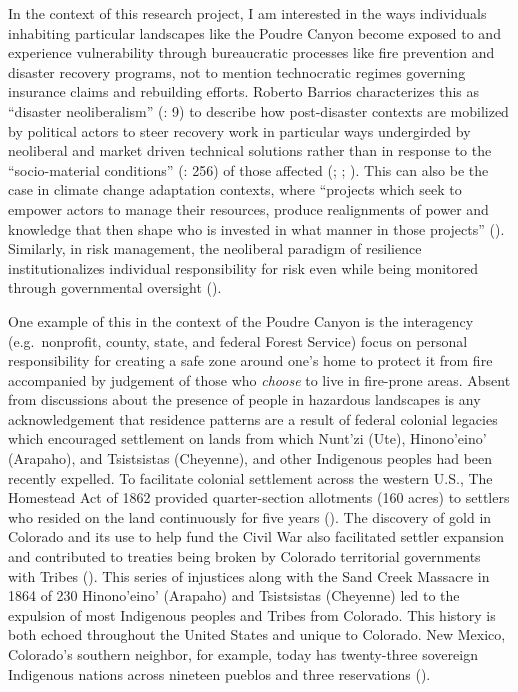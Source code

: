 \documentclass[
]{article}
\begin{document}
In the context of this research project, I am interested in the ways individuals inhabiting particular landscapes like the Poudre Canyon become exposed to and experience vulnerability through bureaucratic processes like fire prevention and disaster recovery programs, not to mention technocratic regimes governing insurance claims and rebuilding efforts. Roberto Barrios characterizes this as ``disaster neoliberalism'' (: 9) to describe how post-disaster contexts are mobilized by political actors to steer recovery work in particular ways undergirded by neoliberal and market driven technical solutions rather than in response to the ``socio-material conditions'' (: 256) of those affected (; ; ). This can also be the case in climate change adaptation contexts, where ``projects which seek to empower actors to manage their resources, produce realignments of power and knowledge that then shape who is invested in what manner in those projects'' (). Similarly, in risk management, the neoliberal paradigm of resilience institutionalizes individual responsibility for risk even while being monitored through governmental oversight ().

One example of this in the context of the Poudre Canyon is the interagency (e.g.~nonprofit, county, state, and federal Forest Service) focus on personal responsibility for creating a safe zone around one's home to protect it from fire accompanied by judgement of those who \emph{choose} to live in fire-prone areas. Absent from discussions about the presence of people in hazardous landscapes is any acknowledgement that residence patterns are a result of federal colonial legacies which encouraged settlement on lands from which Nunt'zi (Ute), Hinono'eino' (Arapaho), and Tsistsistas (Cheyenne), and other Indigenous peoples had been recently expelled. To facilitate colonial settlement across the western U.S., The Homestead Act of 1862 provided quarter-section allotments (160 acres) to settlers who resided on the land continuously for five years (). The discovery of gold in Colorado and its use to help fund the Civil War also facilitated settler expansion and contributed to treaties being broken by Colorado territorial governments with Tribes (). This series of injustices along with the Sand Creek Massacre in 1864 of 230 Hinono'eino' (Arapaho) and Tsistsistas (Cheyenne) led to the expulsion of most Indigenous peoples and Tribes from Colorado. This history is both echoed throughout the United States and unique to Colorado. New Mexico, Colorado's southern neighbor, for example, today has twenty-three sovereign Indigenous nations across nineteen pueblos and three reservations ().
\end{document}
